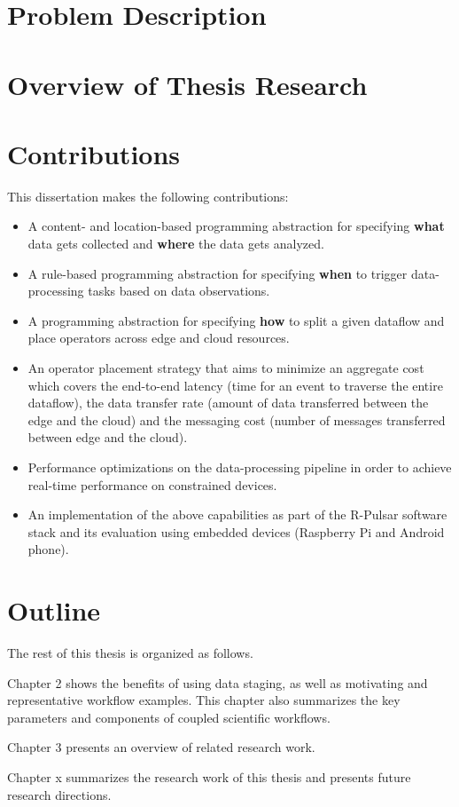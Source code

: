 \section{Problem Description}
\section{Overview of Thesis Research}
\section{Contributions}
This dissertation makes the following contributions:
\begin{itemize}
  \item A content- and location-based programming abstraction for specifying \textbf{what} data gets collected and \textbf{where} the data gets analyzed.
  \item A rule-based programming abstraction for specifying \textbf{when} to trigger data-processing tasks based on data observations.
  \item A programming abstraction for specifying \textbf{how} to split a given dataflow and place operators across edge and cloud resources.
  \item An operator placement strategy that aims to minimize an aggregate cost which covers the end-to-end latency (time for an event to traverse the entire dataflow), the data transfer rate (amount of data transferred between the edge and the cloud) and the messaging cost (number of messages transferred between edge and the cloud).
  \item Performance optimizations on the data-processing pipeline in order to achieve real-time performance on constrained devices.
  \item An implementation of the above capabilities as part of the R-Pulsar software stack and its evaluation using embedded devices (Raspberry Pi and Android phone).
\end{itemize}

\section{Outline}
The rest of this thesis is organized as follows.

Chapter 2 shows the benefits of using data staging, as well as motivating and representative workflow examples. This chapter also summarizes the key parameters and components of coupled scientific workflows.

Chapter 3 presents an overview of related research work.

Chapter x summarizes the research work of this thesis and presents future research
directions.